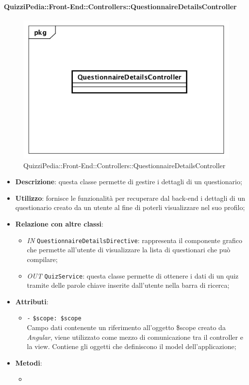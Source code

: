 \paragraph{QuizziPedia::Front-End::Controllers::QuestionnaireDetailsController}
\begin{figure} [ht]
	\centering
	\includegraphics[scale=0.45]{UML/Classi/Front-End/QuizziPedia_Front-end_Controller_QuestionnaireDetailsController.png}
	\caption{QuizziPedia::Front-End::Controllers::QuestionnaireDetailsController}
\end{figure} \FloatBarrier
\begin{itemize}
	\item \textbf{Descrizione}: questa classe permette di gestire i dettagli di un questionario; 
	\item \textbf{Utilizzo}: fornisce le funzionalità per recuperare dal back-end i dettagli di un questionario creato da un utente al fine di poterli visualizzare nel suo profilo;
	\item \textbf{Relazione con altre classi}:
	\begin{itemize}
		\item \textit{IN} \texttt{QuestionnaireDetailsDirective}: rappresenta il componente grafico che permette all'utente di visualizzare la lista di questionari che può compilare;
		\item \textit{OUT} \texttt{QuizService}: questa classe permette di ottenere i dati di un quiz tramite delle parole chiave inserite dall'utente nella barra di ricerca;
	\end{itemize}
	\item \textbf{Attributi}:
	\begin{itemize}
		\item \texttt{-} \texttt{\$scope: \$scope} \\
		Campo dati contenente un riferimento all’oggetto \$scope creato da \textit{Angular}, viene utilizzato come mezzo di comunicazione tra il controller e la view. Contiene gli oggetti che definiscono il model dell’applicazione;
	\end{itemize}
	\item \textbf{Metodi}:
	\begin{itemize}
		\item 
	\end{itemize}
\end{itemize}

